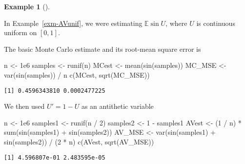 \documentclass[
  letterpaper,
  DIV=11,
  numbers=noendperiod]{scrreprt}
\newenvironment{Shaded}{\begin{snugshade}}{\end{snugshade}}
\newcommand{\DecValTok}[1]{\textcolor[rgb]{0.68,0.00,0.00}{#1}}
\newcommand{\FloatTok}[1]{\textcolor[rgb]{0.68,0.00,0.00}{#1}}
\newcommand{\FunctionTok}[1]{\textcolor[rgb]{0.28,0.35,0.67}{#1}}
\newcommand{\NormalTok}[1]{\textcolor[rgb]{0.00,0.23,0.31}{#1}}
\newcommand{\OtherTok}[1]{\textcolor[rgb]{0.00,0.23,0.31}{#1}}
\newcommand{\SpecialCharTok}[1]{\textcolor[rgb]{0.37,0.37,0.37}{#1}}
\theoremstyle{plain}
\theoremstyle{definition}
\theoremstyle{definition}
\newtheorem{example}{Example}[chapter]
\theoremstyle{remark}
\begin{document}
\begin{example}[]\protect\hypertarget{exm-AV}{}\label{exm-AV}

In Example~\ref{exm-AVunif}, we were estimating \(\mathbb E \sin U\),
where \(U\) is continuous uniform on \([0,1]\).

The basic Monte Carlo estimate and its root-mean square error is

\begin{Shaded}
\begin{Highlighting}[]
\NormalTok{n }\OtherTok{\textless{}{-}} \FloatTok{1e6}
\NormalTok{samples }\OtherTok{\textless{}{-}} \FunctionTok{runif}\NormalTok{(n)}
\NormalTok{MCest }\OtherTok{\textless{}{-}} \FunctionTok{mean}\NormalTok{(}\FunctionTok{sin}\NormalTok{(samples))}
\NormalTok{MC\_MSE }\OtherTok{\textless{}{-}} \FunctionTok{var}\NormalTok{(}\FunctionTok{sin}\NormalTok{(samples)) }\SpecialCharTok{/}\NormalTok{ n}
\FunctionTok{c}\NormalTok{(MCest, }\FunctionTok{sqrt}\NormalTok{(MC\_MSE))}
\end{Highlighting}
\end{Shaded}

\begin{verbatim}
[1] 0.4596343810 0.0002477225
\end{verbatim}

We then used \(U' = 1 - U\) as an antithetic variable

\begin{Shaded}
\begin{Highlighting}[]
\NormalTok{n }\OtherTok{\textless{}{-}} \FloatTok{1e6}
\NormalTok{samples1 }\OtherTok{\textless{}{-}} \FunctionTok{runif}\NormalTok{(n }\SpecialCharTok{/} \DecValTok{2}\NormalTok{)}
\NormalTok{samples2 }\OtherTok{\textless{}{-}} \DecValTok{1} \SpecialCharTok{{-}}\NormalTok{ samples1}
\NormalTok{AVest }\OtherTok{\textless{}{-}}\NormalTok{ (}\DecValTok{1} \SpecialCharTok{/}\NormalTok{ n) }\SpecialCharTok{*} \FunctionTok{sum}\NormalTok{(}\FunctionTok{sin}\NormalTok{(samples1) }\SpecialCharTok{+} \FunctionTok{sin}\NormalTok{(samples2))}
\NormalTok{AV\_MSE }\OtherTok{\textless{}{-}} \FunctionTok{var}\NormalTok{(}\FunctionTok{sin}\NormalTok{(samples1) }\SpecialCharTok{+} \FunctionTok{sin}\NormalTok{(samples2)) }\SpecialCharTok{/}\NormalTok{ (}\DecValTok{2} \SpecialCharTok{*}\NormalTok{ n)}
\FunctionTok{c}\NormalTok{(AVest, }\FunctionTok{sqrt}\NormalTok{(AV\_MSE))}
\end{Highlighting}
\end{Shaded}

\begin{verbatim}
[1] 4.596807e-01 2.483595e-05
\end{verbatim}


\end{example}
\end{document}
